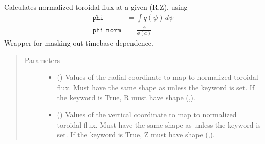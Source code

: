 \documentclass[letterpaper,10pt,english]{sphinxmanual}
\begin{document}
\begin{fulllineitems}
\begin{fulllineitems}
\label{\detokenize{eqtools:eqtools.eqdskreader.EqdskReader.rz2phinorm}}
Calculates normalized toroidal flux at a given (R,Z), using
\begin{equation*}
\begin{split}\texttt{phi} &= \int q(\psi)\,d\psi\\
\texttt{phi\_norm} &= \frac{\phi}{\phi(a)}\end{split}
\end{equation*}
Wrapper for
{\hyperref[\detokenize{eqtools:eqtools.core.Equilibrium.rz2phinorm}]{}}
masking out timebase dependence.
\begin{quote}\begin{description}
\item[{Parameters}] \leavevmode\begin{itemize}
\item {} 
 () \textendash{} Values of the radial coordinate to
map to normalized toroidal flux. Must have the same shape as 
unless the  keyword is set. If the 
keyword is True, R must have shape (,).

\item {} 
 () \textendash{} Values of the vertical coordinate to
map to normalized toroidal flux. Must have the same shape as 
unless the  keyword is set. If the 
keyword is True, Z must have shape (,).

\end{itemize}

\end{description}\end{quote}


\end{fulllineitems}
\end{fulllineitems}
\end{document}
